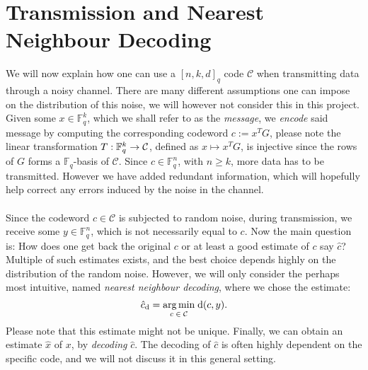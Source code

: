 \section{Transmission and Nearest Neighbour Decoding}\label{sec:transmission_and_nearest_neighbour_decoding}
We will now explain how one can use a $[n,k,d]_{q}$ code $\mathcal{C}$ when transmitting data through a noisy channel. There are many different assumptions one can impose on the distribution of this noise, we will however not consider this in this project. \\
Given some $x \in \mathbb{F}_{q}^{k}$, which we shall refer to as the \textit{message}, we \textit{encode} said message by computing the corresponding codeword $c := x^{T}G$, please note the linear transformation $T: \mathbb{F}^k_q \to \mathcal{C}$, defined as $x \mapsto x^{T}G$, is injective since the rows of $G$ forms a $\mathbb{F}_{q}$-basis of $\mathcal{C}$. Since $c \in \mathbb{F}_q^{n}$, with $n \geq k$, more data has to be transmitted. However we have added redundant information, which will hopefully help correct any errors induced by the noise in the channel.
\\
\\
Since the codeword $c \in \mathcal{C}$ is subjected to random noise, during transmission, we receive some $y \in \mathbb{F}_q^n$, which is not necessarily equal to $c$.
Now the main question is: How does one get back the original $c$ or at least a good estimate of $c$ say $\hat{c}$?
Multiple of such estimates exists, and the best choice depends highly on the distribution of the random noise. However, we will only consider the perhaps most intuitive, named \textit{nearest neighbour decoding}, where we chose the estimate:
\begin{equation*}
   \hat{c}_{\mathrm{d}} = \underset{c \; \in \; \mathcal{C}}{\arg\min} \; \mathrm{d}(c, y).
\end{equation*}
Please note that this estimate might not be unique. Finally, we can obtain an estimate $\hat{x}$ of $x$, by \textit{decoding} $\hat{c}$. The decoding of $\hat{c}$ is often highly dependent on the specific code, and we will not discuss it in this general setting.

